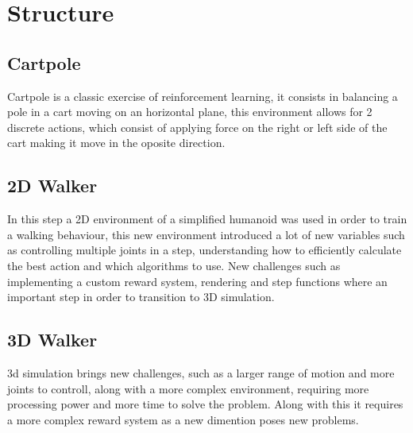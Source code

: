 \section{Structure}

\subsection{Cartpole}
Cartpole is a classic exercise of reinforcement learning, it consists in balancing a pole in a cart moving on an horizontal plane, 
this environment allows for 2 discrete actions, 
which consist of applying force on the right or left side of the cart making it move in the oposite direction. 

\subsection{2D Walker}
In this step a 2D environment of a simplified humanoid was used in order to train a walking behaviour,
this new environment introduced a lot of new variables such as controlling multiple joints in a step, %
understanding how to efficiently calculate the best action and which algorithms to use. 
New challenges such as implementing a custom reward system, rendering and step functions where an important step in order to transition to 3D simulation.

\subsection{3D Walker}
3d simulation brings new challenges, such as a larger range of motion and more joints to controll, along with a more complex environment, requiring more processing power and more time to solve the problem. 
Along with this it requires a more complex reward system as a new dimention poses new problems.

